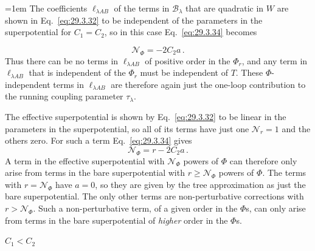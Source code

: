 \begingroup
\emergencystretch=1em
The coefficients \(\ell_{\lambda AB}\) of the terms in
\(\mathcal{B}_\lambda\) that are quadratic in \(W\) are shown in
Eq.~\eqref{eq:29.3.32} to be independent of the parameters in the
superpotential for \(C_1=C_2\), so in this case Eq.~\eqref{eq:29.3.34}
becomes
\par
\endgroup
\begin{equation}
  \mathcal{N}_\Phi=-2C_2a\,.
  \tag{29.3.35}\label{eq:29.3.35}
\end{equation}
Thus there can be no terms in \(\ell_{\lambda AB}\) of positive order in
the \(\Phi_r\), and any term in \(\ell_{\lambda AB}\) that is independent
of the \(\Phi_r\) must be independent of \(T\). These
\(\Phi\)-independent terms in \(\ell_{\lambda AB}\) are therefore again
just the one-loop contribution to the running coupling parameter
\(\tau_\lambda\).

The effective superpotential is shown by Eq.~\eqref{eq:29.3.32} to be
linear in the parameters in the superpotential, so all of its terms have
just one \(\mathcal{N}_r=1\) and the others zero. For such a term
Eq.~\eqref{eq:29.3.34} gives
\begin{equation}
  \mathcal{N}_\Phi=r-2C_2a\,.
  \tag{29.3.36}\label{eq:29.3.36}
\end{equation}
A term in the effective superpotential with \(\mathcal{N}_\Phi\) powers of
\(\Phi\) can therefore only arise from terms in the bare superpotential
with \(r\geq\mathcal{N}_\Phi\) powers of \(\Phi\). The terms with
\(r=\mathcal{N}_\Phi\) have \(a=0\), so they are given by the tree
approximation as just the bare superpotential. The only other terms are
non-perturbative corrections with \(r>\mathcal{N}_\Phi\). Such a
non-perturbative term, of a given order in the \(\Phi\)s, can only arise
from terms in the bare superpotential of \emph{higher} order in the
\(\Phi\)s.

\begin{center}
  \(C_1<C_2\)
\end{center}

